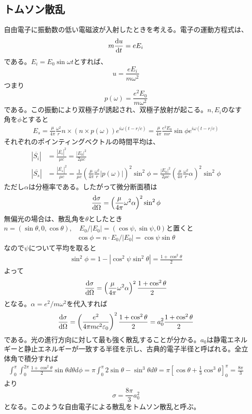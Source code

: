 \subsection{トムソン散乱}
    自由電子に振動数の低い電磁波が入射したときを考える。電子の運動方程式は、
        \[m\dv{u}{t} = eE_i\]
    である。$E_i = E_0\sin\omega t$とすれば、
        \[u = \frac{eE_i}{m\omega^2}\]
    つまり
        \[p(\omega) = \frac{e^2E_0}{m\omega^2}\]
    である。この振動により双極子が誘起され、双極子放射が起こる。$n,E_i$のなす角を$\phi$とすると
    \begin{align*}
        E_s = \frac{\mu}{4\pi}\frac{\omega^2}{r}{n\times(n\times p(\omega))}e^{i\omega(t - r/c)} = \frac{\mu}{4\pi}\frac{e^2E_0}{mr}\sin\phi e^{i\omega(t - r/c)}
    \end{align*}
    それぞれのポインティングベクトルの時間平均は、
    \begin{align*}
        |\overline{S_i}| &= \frac{|\overline{E_i}|^2}{\mu c} = \frac{|E_0|^2}{2\mu c}\\
        |\overline{S_s}| &= \frac{|\overline{E_s}|^2}{\mu c} = \frac{1}{\mu c}\left(\frac{\mu}{4\pi}\frac{\omega^2}{r}|p(\omega)|\right)^2\sin^2\phi = \frac{|E_0|^2}{2\mu c}\left(\frac{\mu}{4\pi}\frac{\omega^2}{r}\alpha\right)^2\sin^2\phi
    \end{align*}
    ただし$\alpha$は分極率である。したがって微分断面積は
    \begin{align*}
        \dv{\sigma}{\Omega} = \left(\frac{\mu}{4\pi}\omega^2\alpha\right)^2\sin^2\phi           
    \end{align*}
    無偏光の場合は、散乱角を$\theta$としたとき$n = (\sin\theta, 0, \cos\theta), \quad E_0 / |E_0| = (\cos\psi, \sin\psi, 0)$と置くと
    \begin{align*}
        \cos\phi = n \cdot E_0 / |E_0| = \cos\psi\sin\theta
    \end{align*}
    なので$\psi$について平均を取ると
    \begin{align*}
        \sin^2\phi = 1 - |\cos^2\psi\sin^2\theta| = \frac{1 + \cos^2\theta}{2}
    \end{align*}
    よって
    \begin{align*}
        \dv{\sigma}{\Omega} = \left(\frac{\mu}{4\pi}\omega^2\alpha\right)^2 \frac{1 + \cos^2\theta}{2}
    \end{align*}
    となる。$\alpha = e^2 / m\omega^2$を代入すれば
    \begin{align*}
        \dv{\sigma}{\Omega} = \left(\frac{e^2}{4\pi mc^2\varepsilon_0}\right)^2 \frac{1 + \cos^2\theta}{2} = a_0^2\frac{1 + \cos^2\theta}{2}
    \end{align*}
    である。光の進行方向に対して最も強く散乱することが分かる。$a_0$は静電エネルギーと静止エネルギーが一致する半径を示し、古典的電子半径と呼ばれる。全立体角で積分すれば
    \begin{align*}
        \int_0^\pi\int_0^{2\pi} \frac{1 + \cos^2\theta}{2}\sin\theta d\theta d\phi = \pi \int_0^\pi 2\sin\theta - \sin^3\theta d\theta = \pi \left[\cos\theta + \frac{1}{3}\cos^3\theta\right]_0^\pi = \frac{8\pi}{3}
    \end{align*}
    より
        \[\sigma = \frac{8\pi}{3}a_0^2\]
    となる。このような自由電子による散乱をトムソン散乱と呼ぶ。

